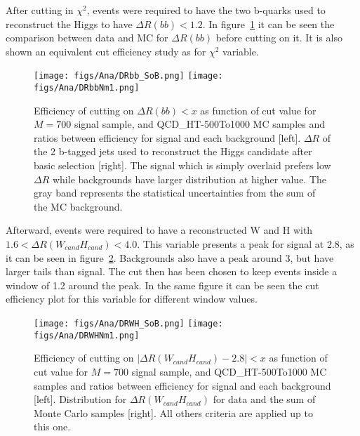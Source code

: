 After cutting in $\chi^{2}$, events were required to have the two b-quarks used to reconstruct the Higgs to have $\Delta R(bb)<1.2$. In figure~\ref{fig:DRbb} it can be seen the comparison between data and MC for $\Delta R(bb)$ before cutting on it. It is also shown an equivalent cut efficiency study as for $\chi^{2}$ variable. 

\begin{figure}[!Hhtbp]
  \begin{center}
    \texttt{[image: figs/Ana/DRbb\_SoB.png]}
    \texttt{[image: figs/Ana/DRbbNm1.png]}
    \caption{Efficiency of cutting on $\Delta R(bb)<x$ as function of cut value for $M=700$ \GeVcc signal sample, \ttbar and QCD\_HT-500To1000 MC samples and ratios between efficiency for signal and each background [left]. $\Delta R$ of the 2 b-tagged jets used to reconstruct the Higgs candidate after basic selection [right]. The signal which is simply overlaid prefers low $\Delta R$ while backgrounds have larger distribution at higher value. The gray band represents the statistical uncertainties from the sum of the MC background.}
    \label{fig:DRbb}
  \end{center}
\end{figure}

Afterward, events were required to have a reconstructed W and H with $1.6<\Delta R (W_{cand} H_{cand})<4.0$. This variable presents a peak for signal at 2.8, as it can be seen in figure~\ref{fig:DRWH}. Backgrounds also have a peak around 3, but have larger tails than signal. The cut then has been chosen to keep events inside a window of 1.2 around the peak. In the same figure it can be seen the cut efficiency plot for this variable for different window values.

\begin{figure}[!Hhtbp]
  \begin{center}
    \texttt{[image: figs/Ana/DRWH\_SoB.png]}
    \texttt{[image: figs/Ana/DRWHNm1.png]}
    \caption{Efficiency of cutting on $|\Delta R(W_{cand} H_{cand})-2.8|<x$ as function of cut value for $M=700$ \GeVcc signal sample, \ttbar and QCD\_HT-500To1000 MC samples and ratios between efficiency for signal and each background [left]. Distribution for $\Delta R (W_{cand} H_{cand})$ for data and the sum of Monte Carlo samples [right]. All others criteria are applied up to this one.}
    \label{fig:DRWH}
  \end{center}
\end{figure}

